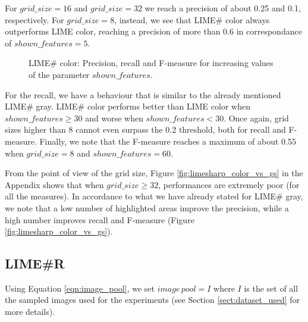 \documentclass[12pt, twoside, a4paper]{report}
\begin{document}
For $grid\_size = 16$ and $grid\_size = 32$ we reach a precision of about 0.25 and 0.1, respectively. For $grid\_size = 8$, instead, we see that LIME\# color always outperforms LIME color, reaching a precision of more than 0.6 in correspondance of $shown\_features = 5$.

\begin{figure}
\centering
{}
\caption{LIME\# color: Precision, recall and F-measure for increasing values of the parameter $shown\_features$.}
\label{subfig:limesharp_color_vs_sf}
\end{figure}

For the recall, we have a behaviour that is similar to the already mentioned LIME\# gray. LIME\# color performs better than LIME color when $shown\_features \geq 30$ and worse when $shown\_features < 30$. Once again, grid sizes higher than 8 cannot even surpass the 0.2 threshold, both for recall and F-measure. 
Finally, we note that the F-measure reaches a maximum of about 0.55 when $grid\_size = 8$ and $shown\_features = 60$. 
\bigskip

From the point of view of the grid size, Figure \ref{fig:limesharp_color_vs_gs} in the Appendix shows that when $grid\_size \geq 32$, performances are extremely poor (for all the measures). 
In accordance to what we have already stated for LIME\# gray, we note that a low number of highlighted areas improve the precision, while a high number improves recall and F-measure (Figure \ref{fig:limesharp_color_vs_gs}). 

\subsection{LIME\#R}\label{sect:limesharpR_expe}

Using Equation \ref{eqn:image_pool}, we set $image\,pool = I$ where $I$ is the set of all the sampled images used for the experiments (see Section \ref{sect:dataset_used} for more details). 
\end{document}
